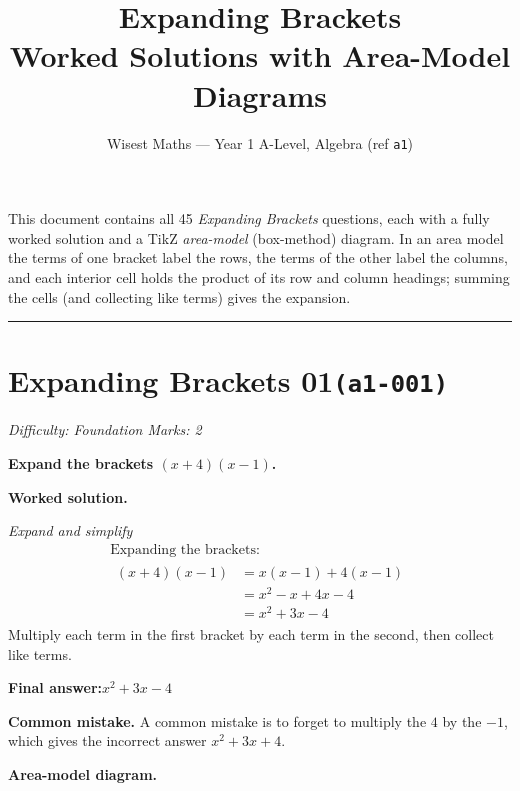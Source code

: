 \documentclass[11pt]{article}
\title{\textbf{Expanding Brackets}\\[0.3em]\large Worked Solutions with Area-Model Diagrams}
\author{Wisest Maths --- Year 1 A-Level, Algebra (ref \texttt{a1})}
\date{}
\newcommand{\question}[1]{\par\medskip\noindent\textbf{#1}\par}
\begin{document}
\maketitle
\noindent This document contains all 45 \emph{Expanding Brackets} questions, each with a fully worked
solution and a TikZ \emph{area-model} (box-method) diagram. In an area model the terms of one
bracket label the rows, the terms of the other label the columns, and each interior cell holds the
product of its row and column headings; summing the cells (and collecting like terms) gives the
expansion.
\tableofcontents
\bigskip
\hrule

\section*{Expanding Brackets 01\quad\small\texttt{(a1-001)}}
\textit{Difficulty: Foundation \quad\textbar\quad Marks: 2}

\question{Expand the brackets \((x+4)(x-1)\).}

\textbf{Worked solution.}

\textit{Expand and simplify}
\[\begin{gathered}
\text{Expanding the brackets:} \\[1em] \begin{aligned} (x+4)(x-1) &= x(x-1)+4(x-1) \\ &= x^2-x+4x-4 \\ &= x^2+3x-4 \end{aligned}
\end{gathered}\]
Multiply each term in the first bracket by each term in the second, then collect like terms.

\begin{answerbox}
\textbf{Final answer:}\quad \(\displaystyle x^2+3x-4\)
\end{answerbox}
\textbf{Common mistake.} A common mistake is to forget to multiply the \(4\) by the \(-1\), which gives the incorrect answer \(x^2+3x+4\).

\textbf{Area-model diagram.}
\end{document}
